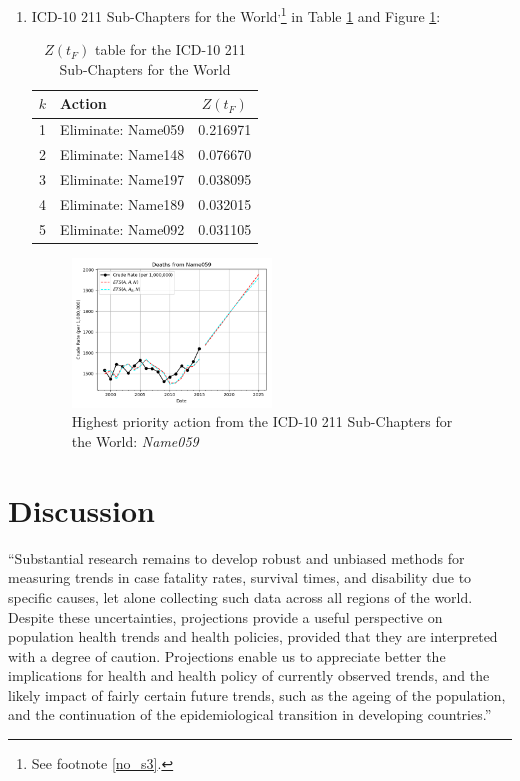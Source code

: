 \documentclass[12pt, a4paper, twocolumn]{article}
\begin{document}
\begin{enumerate}
  \vfill\eject
  \item ICD-10 211 Sub-Chapters for the World\cite{whomortality}\textsuperscript{,}\footnote{See footnote \ref{no_s3}.} in Table \ref{table:ztable11} and Figure \ref{fig:k11}:
    \begin{table}[H]
      \centering
      \begin{tabular}{clc}
        \toprule
          $k$ & Action             & $Z(t_F)$ \\
        \midrule
          1   & Eliminate: Name059 & 0.216971 \\
          2   & Eliminate: Name148 & 0.076670 \\
          3   & Eliminate: Name197 & 0.038095 \\
          4   & Eliminate: Name189 & 0.032015 \\
          5   & Eliminate: Name092 & 0.031105 \\
        \bottomrule
      \end{tabular}
      \caption{$Z(t_F)$ table for the ICD-10 211 Sub-Chapters for the World}
      \label{table:ztable11}
    \end{table}
    \begin{figure}[H]
      \centering
      \includegraphics[width=0.5\textwidth]{results/WORLD_ICD10_SUB_CHAPTERS/Name059_ets.png}
      \caption{Highest priority action from the ICD-10 211 Sub-Chapters for the World: \textit{Name059}}\label{fig:k11}
    \end{figure}
\end{enumerate}

\section{Discussion}

\enquote{Substantial research remains to develop robust and unbiased methods for measuring trends in case fatality rates, survival times, and disability due to specific causes, let alone collecting such data across all regions of the world. Despite these uncertainties, projections provide a useful perspective on population health trends and health policies, provided that they are interpreted with a degree of caution. Projections enable us to appreciate better the implications for health and health policy of currently observed trends, and the likely impact of fairly certain future trends, such as the ageing of the population, and the continuation of the epidemiological transition in developing countries.}\cite{mathers2006projections}
\end{document}
